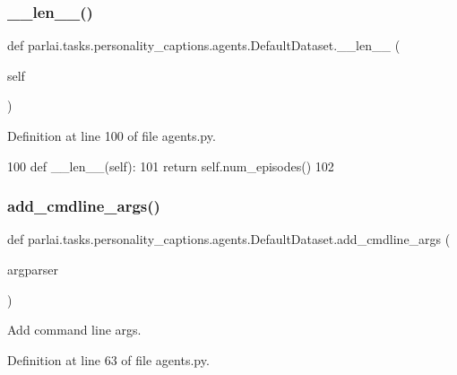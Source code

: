 \subsubsection{\texorpdfstring{\+\_\+\+\_\+len\+\_\+\+\_\+()}{\_\_len\_\_()}}
{\footnotesize\ttfamily def parlai.\+tasks.\+personality\+\_\+captions.\+agents.\+Default\+Dataset.\+\_\+\+\_\+len\+\_\+\+\_\+ (\begin{DoxyParamCaption}\item[{}]{self }\end{DoxyParamCaption})}



Definition at line 100 of file agents.\+py.


\begin{DoxyCode}
100     \textcolor{keyword}{def }\_\_len\_\_(self):
101         \textcolor{keywordflow}{return} self.num\_episodes()
102 
\end{DoxyCode}
\mbox{\label{classparlai_1_1tasks_1_1personality__captions_1_1agents_1_1DefaultDataset_ae81ce7e05c42b214d42a5a4a5c471c8e}} 
\subsubsection{\texorpdfstring{add\+\_\+cmdline\+\_\+args()}{add\_cmdline\_args()}}
{\footnotesize\ttfamily def parlai.\+tasks.\+personality\+\_\+captions.\+agents.\+Default\+Dataset.\+add\+\_\+cmdline\+\_\+args (\begin{DoxyParamCaption}\item[{}]{argparser }\end{DoxyParamCaption})\hspace{0.3cm}{\ttfamily [static]}}

\begin{DoxyVerb}Add command line args.
\end{DoxyVerb}
 

Definition at line 63 of file agents.\+py.


